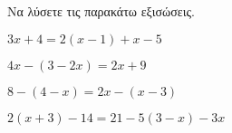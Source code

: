 Να λύσετε τις παρακάτω εξισώσεις.
\begin{multicols}{2}
\begin{alist}
\item $ 3x+4=2(x-1)+x-5 $
\item $ 4x-(3-2x)=2x+9 $
\item $ 8-(4-x)=2x-(x-3) $
\item $ 2(x+3)-14=21-5(3-x)-3x $
\end{alist}
\end{multicols}
